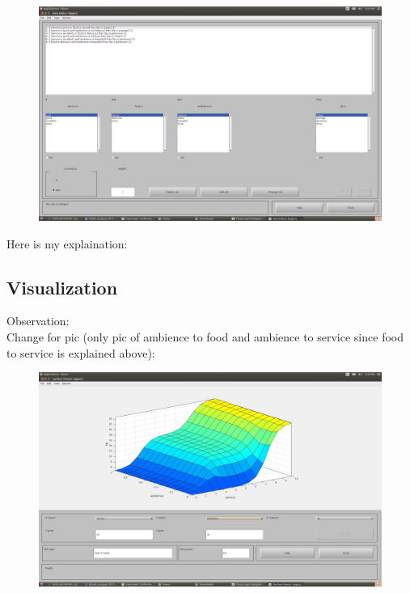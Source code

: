 \documentclass[a4paper, 11pt]{article}
\begin{document}
\begin{figure}[ht]
\includegraphics[scale=0.2]{ambience-rules.jpg}
\end{figure}

Here is my explaination:

\newpage
\subsection{Visualization}
Observation:\\
Change for pic (only pic of ambience to food and ambience to service since food to service is explained above):

\begin{figure}[ht]
\includegraphics[scale=0.15]{ambience-surface-s.jpg}
\end{figure}
\end{document}
